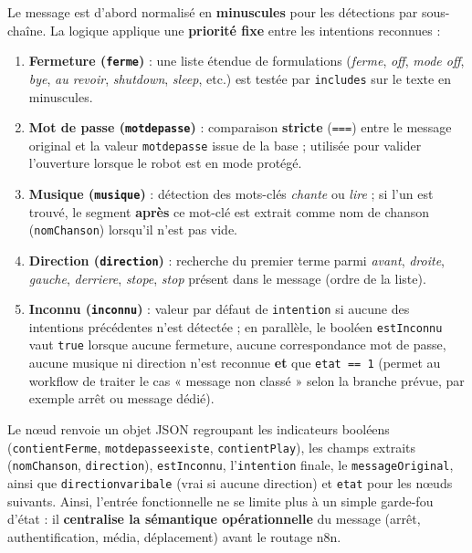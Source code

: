 \documentclass[a4paper,12pt]{report}
\begin{document}
  Le message est d'abord normalisé en \textbf{minuscules} pour les détections par sous-chaîne. La logique applique une \textbf{priorité fixe} entre les intentions reconnues :
  \begin{enumerate}
  	\item \textbf{Fermeture (\texttt{ferme})} : une liste étendue de formulations (\emph{ferme}, \emph{off}, \emph{mode off}, \emph{bye}, \emph{au revoir}, \emph{shutdown}, \emph{sleep}, etc.) est testée par \texttt{includes} sur le texte en minuscules.
  	\item \textbf{Mot de passe (\texttt{motdepasse})} : comparaison \textbf{stricte} (\texttt{===}) entre le message original et la valeur \texttt{motdepasse} issue de la base ; utilisée pour valider l'ouverture lorsque le robot est en mode protégé.
  	\item \textbf{Musique (\texttt{musique})} : détection des mots-clés \emph{chante} ou \emph{lire} ; si l'un est trouvé, le segment \textbf{après} ce mot-clé est extrait comme nom de chanson (\texttt{nomChanson}) lorsqu'il n'est pas vide.
  	\item \textbf{Direction (\texttt{direction})} : recherche du premier terme parmi \emph{avant}, \emph{droite}, \emph{gauche}, \emph{derriere}, \emph{stope}, \emph{stop} présent dans le message (ordre de la liste).
  	\item \textbf{Inconnu (\texttt{inconnu})} : valeur par défaut de \texttt{intention} si aucune des intentions précédentes n'est détectée ; en parallèle, le booléen \texttt{estInconnu} vaut \texttt{true} lorsque aucune fermeture, aucune correspondance mot de passe, aucune musique ni direction n'est reconnue \textbf{et} que \texttt{etat == 1} (permet au workflow de traiter le cas « message non classé » selon la branche prévue, par exemple arrêt ou message dédié).
  \end{enumerate}
  
  Le nœud renvoie un objet JSON regroupant les indicateurs booléens (\texttt{contientFerme}, \texttt{motdepasseexiste}, \texttt{contientPlay}), les champs extraits (\texttt{nomChanson}, \texttt{direction}), \texttt{estInconnu}, l'\texttt{intention} finale, le \texttt{messageOriginal}, ainsi que \texttt{directionvaribale} (vrai si aucune direction) et \texttt{etat} pour les nœuds suivants. Ainsi, l'entrée fonctionnelle ne se limite plus à un simple garde-fou d'état : il \textbf{centralise la sémantique opérationnelle} du message (arrêt, authentification, média, déplacement) avant le routage n8n.
  
\end{document}
